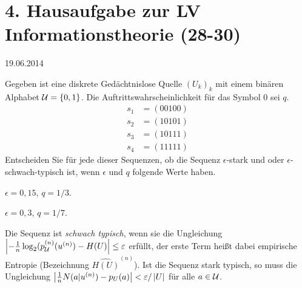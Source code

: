 \documentclass{article}
\begin{document}
\section{4. Hausaufgabe zur LV Informationstheorie (28-30)}\hfill{19.06.2014}
\begin{exercise}
    Gegeben ist eine diskrete Gedächtnislose Quelle $(U_k)_k$ mit einem binären Alphabet $\cU=\set{0,1}$. Die Auftrittswahrscheinlichkeit für das Symbol $0$ sei $q$.
    \begin{align*}
        s_1&=(00100)\\
        s_2&=(10101)\\
        s_3&=(10111)\\
        s_4&=(11111)
    \end{align*}
    Entscheiden Sie für jede dieser Sequenzen, ob die Sequenz $\epsilon$-stark und oder $\epsilon$-schwach-typisch ist, wenn $\epsilon$ und $q$ folgende Werte haben.
    \begin{tasks}
            \item $\epsilon=0,15$, $q=1/3$.
            \item $\epsilon=0,3$, $q=1/7$.
    \end{tasks}
\end{exercise}

\begin{remark}
    Die Sequenz ist \emph{schwach typisch}, wenn sie die Ungleichung $\left|-\frac 1 n \log_2(p_{\mathcal{U}}^{(n)}(u^{(n)})-H(U)\right|\leq \varepsilon$ erfüllt, der erste Term heißt dabei empirische Entropie (Bezeichnung $\hat {H(U)}^{(n)}$). Ist die Sequenz stark typisch, so muss die Ungleichung $\left|\frac 1 n N(a|u^{(n)})-p_U(a)\right|<\varepsilon/\left|U\right|$ für alle $a\in\mathcal{U}$.
\end{remark}
\end{document}

